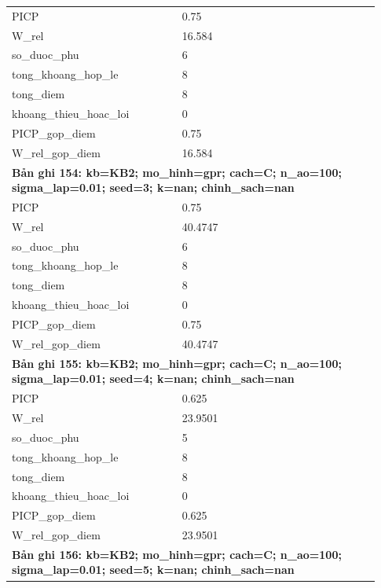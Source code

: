 \begin{longtable}{p{0.43\linewidth}p{0.50\linewidth}}
PICP & 0.75 \\
W\_\allowbreak rel & 16.584 \\
so\_\allowbreak duoc\_\allowbreak phu & 6 \\
tong\_\allowbreak khoang\_\allowbreak hop\_\allowbreak le & 8 \\
tong\_\allowbreak diem & 8 \\
khoang\_\allowbreak thieu\_\allowbreak hoac\_\allowbreak loi & 0 \\
PICP\_\allowbreak gop\_\allowbreak diem & 0.75 \\
W\_\allowbreak rel\_\allowbreak gop\_\allowbreak diem & 16.584 \\
\midrule
\multicolumn{2}{p{0.95\linewidth}}{\textbf{Bản ghi 154: kb=KB2; mo\_hinh=gpr; cach=C; n\_ao=100; sigma\_lap=0.01; seed=3; k=nan; chinh\_sach=nan}} \\
PICP & 0.75 \\
W\_\allowbreak rel & 40.4747 \\
so\_\allowbreak duoc\_\allowbreak phu & 6 \\
tong\_\allowbreak khoang\_\allowbreak hop\_\allowbreak le & 8 \\
tong\_\allowbreak diem & 8 \\
khoang\_\allowbreak thieu\_\allowbreak hoac\_\allowbreak loi & 0 \\
PICP\_\allowbreak gop\_\allowbreak diem & 0.75 \\
W\_\allowbreak rel\_\allowbreak gop\_\allowbreak diem & 40.4747 \\
\midrule
\multicolumn{2}{p{0.95\linewidth}}{\textbf{Bản ghi 155: kb=KB2; mo\_hinh=gpr; cach=C; n\_ao=100; sigma\_lap=0.01; seed=4; k=nan; chinh\_sach=nan}} \\
PICP & 0.625 \\
W\_\allowbreak rel & 23.9501 \\
so\_\allowbreak duoc\_\allowbreak phu & 5 \\
tong\_\allowbreak khoang\_\allowbreak hop\_\allowbreak le & 8 \\
tong\_\allowbreak diem & 8 \\
khoang\_\allowbreak thieu\_\allowbreak hoac\_\allowbreak loi & 0 \\
PICP\_\allowbreak gop\_\allowbreak diem & 0.625 \\
W\_\allowbreak rel\_\allowbreak gop\_\allowbreak diem & 23.9501 \\
\midrule
\multicolumn{2}{p{0.95\linewidth}}{\textbf{Bản ghi 156: kb=KB2; mo\_hinh=gpr; cach=C; n\_ao=100; sigma\_lap=0.01; seed=5; k=nan; chinh\_sach=nan}} \\

\end{longtable}
